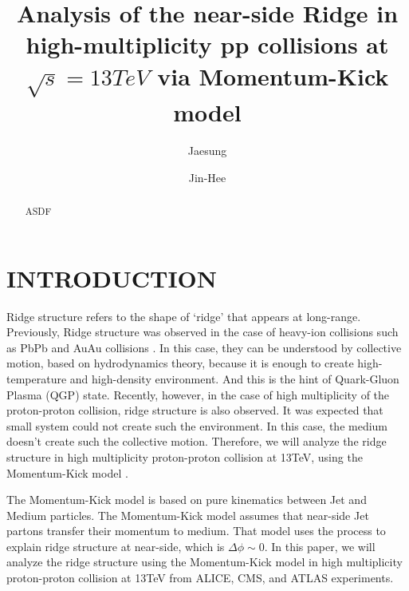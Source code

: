 \documentclass[jkps,fleqn,showpacs,showkeys]{revtex4-2}
\begin{document}
\title{Analysis of the near-side Ridge in high-multiplicity pp collisions at $\sqrt{s}=13TeV$ via Momentum-Kick model}
\author{Jaesung }
\author{Jin-Hee }

\date{}

\begin{abstract}
 ASDF
\end{abstract}



\maketitle

\section*{INTRODUCTION}
\label{sec:Introduction}

Ridge structure refers to the shape of ‘ridge’ that appears at long-range.
Previously, Ridge structure was observed in the case of heavy-ion collisions such as PbPb \cite{ref1, ref2, ref3, ref4, ref5, ref6, ref7, ref8, ref9, ref10, ref11} 
and AuAu collisions \cite{ref12, ref13, ref14, ref15, ref16, ref17, ref18, ref19, ref20, ref21, ref22, ref23, ref24, ref25, ref26, ref27}. 
In this case, they can be understood by collective motion, based on hydrodynamics theory, because it is enough to create high-temperature and high-density environment.
And this is the hint of Quark-Gluon Plasma (QGP) state.
Recently, however, in the case of high multiplicity of the proton-proton collision, ridge structure is also observed.
It was expected that small system could not create such the environment. 
In this case, the medium doesn’t create such the collective motion.
Therefore, we will analyze the ridge structure in high multiplicity proton-proton collision at 13TeV, using the Momentum-Kick model \cite{Wong_2, Wong_3, Wong_4, Wong_5}.

The Momentum-Kick model is based on pure kinematics between Jet and Medium particles.
The Momentum-Kick model assumes that near-side Jet partons transfer their momentum to medium.
That model uses the process to explain ridge structure at near-side, which is $\Delta \phi \sim 0$.
In this paper, we will analyze the ridge structure using the Momentum-Kick model in high multiplicity proton-proton collision 
at 13TeV from ALICE, CMS, and ATLAS experiments.
\end{document}
